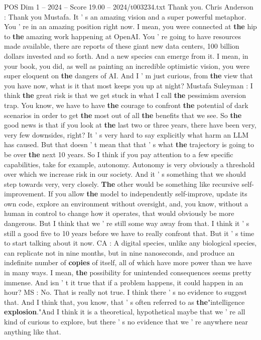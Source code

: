 \begin{textsample}{POS Dim 1 – 2024 – Score 19.00 – 2024/t003234.txt}
Thank you.
Chris Anderson : Thank you Mustafa.
It ' s an amazing vision and a super powerful metaphor.
You ' re in an amazing position right now.
I mean, you were connected at \textbf{the} hip to \textbf{the} amazing work happening at OpenAI.
You ' re going to have resources made available, there are reports of these giant new data centers, 100 billion dollars invested and so forth.
And a new species can emerge from it.
I mean, in your book, you did, as well as painting an incredible optimistic vision, you were super eloquent on \textbf{the} dangers of AI.
And I ' m just curious, from \textbf{the} view that you have now, what is it that most keeps you up at night?
Mustafa Suleyman : I think \textbf{the} great risk is that we get stuck in what I call \textbf{the} pessimism aversion trap.
You know, we have to have \textbf{the} courage to confront \textbf{the} potential of dark scenarios in order to get \textbf{the} most out of all \textbf{the} benefits that we see.
So \textbf{the} good news is that if you look at \textbf{the} last two or three years, there have been very, very few downsides, right?
It ' s very hard to say explicitly what harm an LLM has caused.
But that doesn ' t mean that that ' s what \textbf{the} trajectory is going to be over \textbf{the} next 10 years.
So I think if you pay attention to a few specific capabilities, take for example, autonomy.
Autonomy is very obviously a threshold over which we increase risk in our society.
And it ' s something that we should step towards very, very closely. \textbf{The} other would be something like recursive self-improvement.
If you allow \textbf{the} model to independently self-improve, update its own code, explore an environment without oversight, and, you know, without a human in control to change how it operates, that would obviously be more dangerous.
But I think that we ' re still some way away from that.
I think it ' s still a good five to 10 years before we have to really confront that.
But it ' s time to start talking about it now.
CA : A digital species, unlike any biological species, can replicate not in nine months, but in nine nanoseconds, and produce an indefinite number of \textbf{copies} of itself, all of which have more power than we have in many ways.
I mean, \textbf{the} possibility for unintended consequences seems pretty immense.
And isn ' t it true that if a problem happens, it could happen in an hour?
MS : No.
That is really not true.
I think there ' s no evidence to suggest that.
And I think that, you know, that ' s often referred to as \textbf{the}"intelligence \textbf{explosion}."And I think it is a theoretical, hypothetical maybe that we ' re all kind of curious to explore, but there ' s no evidence that we ' re anywhere near anything like that.

\end{textsample}
